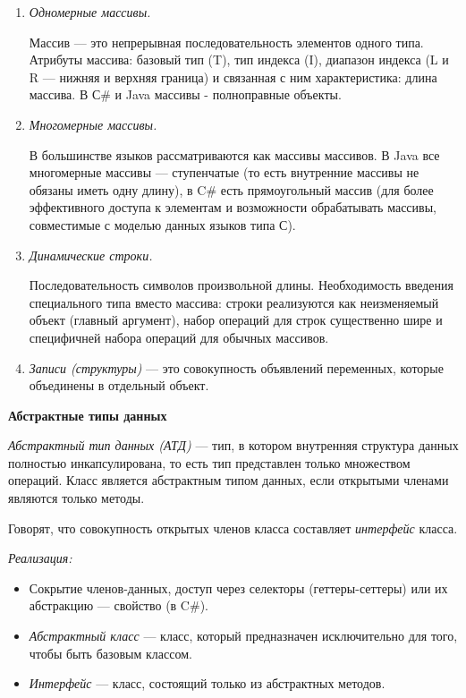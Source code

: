\begin{enumerate}
    \item \textit{Одномерные массивы.}
    
    Массив — это непрерывная последовательность элементов одного типа.
    Атрибуты массива: базовый тип (T), тип индекса (I), диапазон индекса (L и R — нижняя и верхняя граница) и связанная с ним характеристика: длина массива. 
    В С\# и Java массивы - полноправные объекты.
    \item \textit{Многомерные массивы.}
    
    В большинстве языков рассматриваются как массивы массивов.
    В Java все многомерные массивы --- ступенчатые (то есть внутренние массивы не обязаны иметь одну длину), в C\# есть прямоугольный массив (для более эффективного доступа к элементам и возможности обрабатывать массивы, совместимые с моделью данных языков типа С).
    \item \textit{Динамические строки.}
    
    Последовательность символов произвольной длины.
    Необходимость введения специального типа вместо массива: строки реализуются как неизменяемый объект (главный аргумент), набор операций для строк существенно шире и специфичней набора операций для обычных массивов.
    \item \textit{Записи (структуры)} --- это совокупность объявлений переменных, которые объединены в отдельный объект.
\end{enumerate}

\textbf{Абстрактные типы данных}

\textit{Абстрактный тип данных (АТД)} --- тип, в котором внутренняя структура данных полностью инкапсулирована, то есть тип представлен только множеством операций.
Класс является абстрактным типом данных, если открытыми членами являются только методы. 

Говорят, что совокупность открытых членов класса составляет \textit{интерфейс} класса. 

\textit{Реализация:}
\begin{itemize}
    \item Сокрытие членов-данных, доступ через селекторы (геттеры-сеттеры) или их абстракцию --- свойство (в C\#).
    \item \textit{Абстрактный класс} --- класс, который предназначен исключительно для того, чтобы быть базовым классом.
    \item \textit{Интерфейс} --- класс, состоящий только из абстрактных методов.
\end{itemize}

